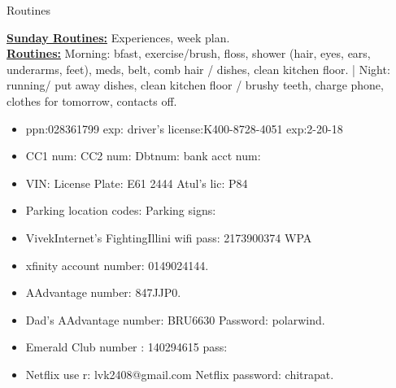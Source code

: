\documentclass[serif, mathserif, final]{beamer}
\begin{document}
\begin{frame}
  \begin{columns}
    \begin{column}{0.25\linewidth} %
      \begin{block}{Routines}
        
      \textbf{\underline{Sunday Routines:}} Experiences, week plan. \\ 
      \textbf{\underline{Routines:}} Morning: bfast, exercise/brush,
      floss, shower (hair, eyes, ears, underarms, feet), meds, belt,
      comb hair / dishes, clean kitchen floor. |  Night: running/ put
      away dishes, clean kitchen floor / brushy teeth, charge phone,
      clothes for tomorrow, contacts off. \\
  
      \begin{itemize}
      \item \tiny ppn:028361799  exp: driver's license:K400-8728-4051  exp:2-20-18 
      \item \tiny CC1 num: CC2 num: Dbtnum:  bank acct num:  
      \item \tiny VIN:    License Plate:  E61 2444    Atul's lic: P84  
      \item \tiny Parking location codes:   Parking signs: 
      \item \tiny VivekInternet’s FightingIllini  wifi pass: 2173900374 WPA 
      \item \tiny xfinity account number: 0149024144. 
      \item \tiny AAdvantage number: 847JJP0.
      \item \tiny Dad's AAdvantage number: BRU6630 Password: polarwind.
      \item \tiny Emerald Club number :  140294615   pass:  
      \item \tiny Netflix use
        r:  lvk2408@gmail.com  Netflix password: chitrapat. 
      \end{itemize}
      \end{block}


\end{column}
\end{columns}
\end{frame}
\end{document}
